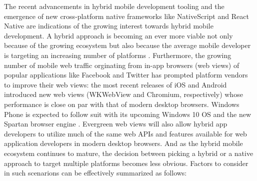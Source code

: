 \documentclass[thesis.tex]{subfiles}
\begin{document}
The recent advancements in hybrid mobile development tooling and the emergence of new cross-platform native frameworks like NativeScript and React Native are indications of the growing interest towards hybrid mobile development. A hybrid approach is becoming an ever more viable not only because of the growing ecosystem but also because the average mobile developer is targeting an increasing number of platforms \cite{two_platforms}. Furthermore, the growing number of mobile web traffic orginating from in-app browsers (web views) of popular applications like Facebook and Twitter has prompted platform vendors to improve their web views: the most recent releases of iOS and Android introduced new web views (WKWebView and Chromium, respectively) whose performance is close on par with that of modern desktop browsers. \cite{souders_webview} Windows Phone is expected to follow suit with its upcoming Windows 10 OS and the new Spartan browser engine \cite{spartan}. Evergreen web views will also allow hybrid app developers to utilize much of the same web APIs and features available for web application developers in modern desktop browsers. And as the hybrid mobile ecosystem continues to mature, the decision between picking a hybrid or a native approach to target multiple platforms becomes less obvious. Factors to consider in such scenarions can be effectively summarized as follows:
\end{document}
